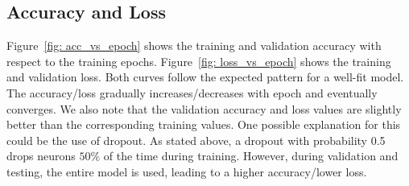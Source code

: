 \documentclass[journal]{IEEEtran}
\begin{document}
\subsection{Accuracy and Loss} \label{subsec: accuracy}
Figure~\ref{fig: acc_vs_epoch} shows the training and validation accuracy with respect to the training epochs. Figure~\ref{fig: loss_vs_epoch} shows the training and validation loss. Both curves follow the expected pattern for a well-fit model. The accuracy/loss gradually increases/decreases with epoch and eventually converges. We also note that the validation accuracy and loss values are slightly better than the corresponding training values. One possible explanation for this could be the use of dropout. As stated above, a dropout with probability 0.5 drops neurons $50\%$ of the time during training. However, during validation and testing, the entire model is used, leading to a higher accuracy/lower loss. 
\end{document}
